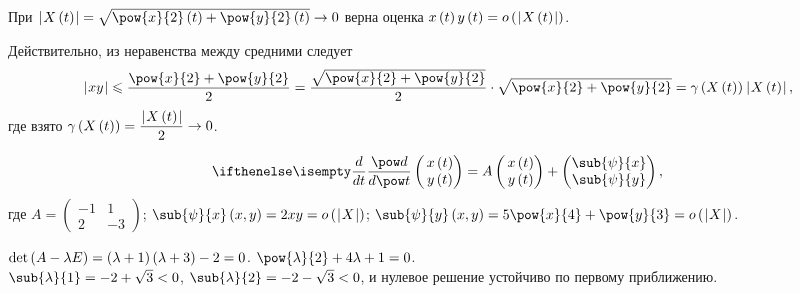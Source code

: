 \documentclass[a5paper,10pt]{article}
\begin{document}
\begin{framed}
    \begin{proposition}
    При $\vbr{X\br{t}} = \sqrt{\pow{x}{2}\br{t} + \pow{y}{2}\br{t}} \to 0$
    верна оценка $x\br{t} y\br{t} = o\br{\vbr{X\br{t}}}$.
    \end{proposition}
    
    Действительно, из неравенства между средними следует 
    $$\vbr{xy} \le \dfrac {\pow{x}{2} + \pow{y}{2}} {2} 
        = \dfrac {\sqrt{\pow{x}{2} + \pow{y}{2}}} {2} \cdot \sqrt{\pow{x}{2} + \pow{y}{2}}
        = \gamma\br{X\br{t}} \vbr{X\br{t}}, $$
    где взято $\gamma\left(\hspace{0.01em}X\left(\hspace{0.01em}t\hspace{0.01em}\right)\hspace{0.01em}\right) = \dfrac {\hspace{0.2mm}\left|\hspace{0.06em}X\left(\hspace{0.01em}t\hspace{0.01em}\right)\hspace{0.06em}\right|} {2} \to 0$.
\end{framed}
\vspace{-\lineskip * 2}
$$\der{}{t} \begin{pmatrix}\,x\br{t} \\ \,y\br{t}\end{pmatrix} 
    = A \begin{pmatrix}\,x\br{t} \\ \,y\br{t}\end{pmatrix} 
    + \begin{pmatrix}\sub{\psi}{x} \\ \sub{\psi}{y} \end{pmatrix},$$
где 
$A = \begin{pmatrix} -1 & 1 \\ 2 & -3 \end{pmatrix}$;
$\sub{\psi}{x}\br{x, y} = 2xy = o\br{\vbr{X}}$;
$\sub{\psi}{y}\br{x, y} = 5\pow{x}{4} + \pow{y}{3} = o\br{\vbr{X}}$.

$\det \left(\hspace{0.01em}A - \lambda E\hspace{0.01em}\right) = \left(\hspace{0.01em}\lambda + 1\hspace{0.01em}\right) \left(\hspace{0.01em}\lambda + 3\hspace{0.01em}\right) - 2 = 0$.
$\pow{\lambda}{2} + 4 \lambda + 1 = 0$. \\
$\sub{\lambda}{1} = -2 + \sqrt{3} < 0$, 
$\sub{\lambda}{2} = -2 - \sqrt{3} < 0$, 
и нулевое решение устойчиво по первому приближению.
\end{document}
